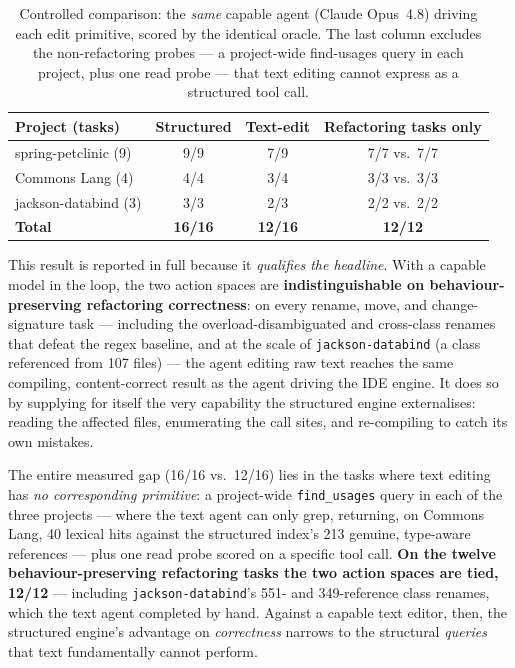 \begin{table}[t]
  \centering
  \caption{Controlled comparison: the \emph{same} capable agent (Claude Opus~4.8)
  driving each edit primitive, scored by the identical oracle. The last column
  excludes the non-refactoring probes --- a project-wide find-usages query in each
  project, plus one read probe --- that text editing cannot express as a structured
  tool call.}
  \label{tab:controlled}
  \begin{tabular}{@{}lccc@{}}
    \toprule
    Project (tasks) & Structured & Text-edit & Refactoring tasks only \\
    \midrule
    spring-petclinic (9)  & 9/9            & 7/9            & 7/7 vs.\ 7/7 \\
    Commons Lang (4)      & 4/4            & 3/4            & 3/3 vs.\ 3/3 \\
    jackson-databind (3)  & 3/3            & 2/3            & 2/2 vs.\ 2/2 \\
    \midrule
    \textbf{Total}        & \textbf{16/16} & \textbf{12/16} & \textbf{12/12} \\
    \bottomrule
  \end{tabular}
\end{table}

This result is reported in full because it \emph{qualifies the headline}. With a
capable model in the loop, the two action spaces are \textbf{indistinguishable on
behaviour-preserving refactoring correctness}: on every rename, move, and
change-signature task --- including the overload-disambiguated and cross-class
renames that defeat the regex baseline, and at the scale of \texttt{jackson-databind}
(a class referenced from 107 files) --- the agent editing raw text reaches the same
compiling, content-correct result as the agent driving the IDE engine. It does so by
supplying for itself the very capability the structured engine externalises: reading
the affected files, enumerating the call sites, and re-compiling to catch its own
mistakes.

The entire measured gap (16/16 vs.\ 12/16) lies in the tasks where text editing has
\emph{no corresponding primitive}: a project-wide \texttt{find\_usages} query in each
of the three projects --- where the text agent can only grep, returning, on Commons
Lang, 40 lexical hits against the structured index's 213 genuine, type-aware
references --- plus one read probe scored on a specific tool call. \textbf{On the
twelve behaviour-preserving refactoring tasks the two action spaces are tied, 12/12}
--- including \texttt{jackson-databind}'s 551- and 349-reference class renames, which
the text agent completed by hand. Against a capable text editor, then, the structured
engine's advantage on \emph{correctness} narrows to the structural \emph{queries} that
text fundamentally cannot perform.

